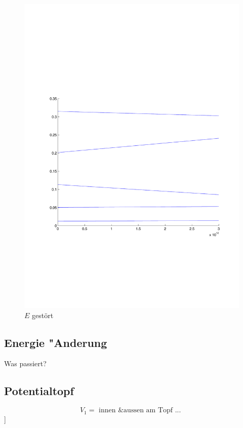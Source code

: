 \begin{refsection}
\begin{figure}
 \centering
 \includegraphics[width=12cm,clip=true,trim=2cm 7cm 1cm 8cm]{efeld/Energie_gestoert.pdf}
 \caption{$E$ gest\"ort}
 \label{abb:efeld_E_gestoert}
\end{figure}



\subsection{ Energie "Anderung }

Was passiert?

\subsection{ Potentialtopf }

\[
  V_1 = \text{ innen \& aussen am Topf ... }
\]
]


\printbibliography[heading=subbibliography]
\end{refsection}
